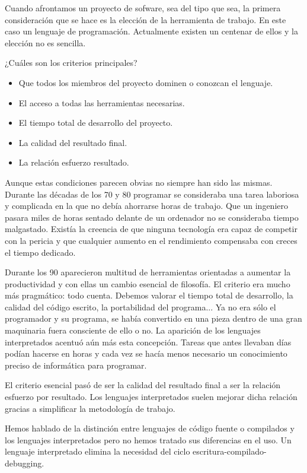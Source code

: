 Cuando afrontamos un proyecto de sofware, sea del tipo que sea, la
primera consideración que se hace es la elección de la herramienta de
trabajo. En este caso un lenguaje de programación. Actualmente existen
un centenar de ellos y la elección no es sencilla.

¿Cuáles son los criterios principales?

\begin{itemize}
\item Que todos los miembros del proyecto dominen o conozcan el
  lenguaje.
\item El acceso a todas las herramientas necesarias.
\item El tiempo total de desarrollo del proyecto.
\item La calidad del resultado final.
\item La relación esfuerzo resultado.
\end{itemize}

Aunque estas condiciones parecen obvias no siempre han sido las
mismas.  Durante las décadas de los 70 y 80 programar se consideraba
una tarea laboriosa y complicada en la que no debía ahorrarse horas de
trabajo.  Que un ingeniero pasara miles de horas sentado delante de un
ordenador no se consideraba tiempo malgastado.  Existía la creencia de
que ninguna tecnología era capaz de competir con la pericia y que
cualquier aumento en el rendimiento compensaba con creces el tiempo
dedicado.

Durante los 90 aparecieron multitud de herramientas orientadas a
aumentar la productividad y con ellas un cambio esencial de filosofía.
El criterio era mucho más pragmático: todo cuenta.  Debemos valorar el
tiempo total de desarrollo, la calidad del código escrito, la
portabilidad del programa...  Ya no era sólo el programador y su
programa, se había convertido en una pieza dentro de una gran
maquinaria fuera consciente de ello o no.  La aparición de los
lenguajes interpretados acentuó aún más esta concepción.  Tareas que
antes llevaban días podían hacerse en horas y cada vez se hacía menos
necesario un conocimiento preciso de informática para programar.

El criterio esencial pasó de ser la calidad del resultado final a ser
la relación esfuerzo por resultado.  Los lenguajes interpretados suelen
mejorar dicha relación gracias a simplificar la metodología de
trabajo.

Hemos hablado de la distinción entre lenguajes de código fuente o
compilados y los lenguajes interpretados pero no hemos tratado sus
diferencias en el uso. Un lenguaje interpretado elimina la
necesidad del ciclo escritura-compilado-debugging.


